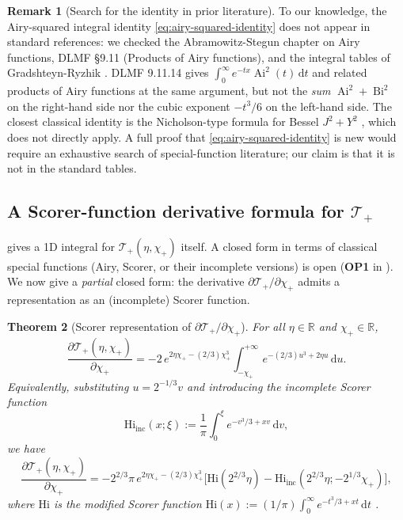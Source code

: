 \documentclass[11pt,a4paper]{article}
\theoremstyle{plain}
\newtheorem{theorem}{Theorem}[section]
\theoremstyle{definition}
\newtheorem{remark}[theorem]{Remark}
\newcommand{\R}{\mathbb{R}}
\renewcommand{\d}{\mathrm{d}}
\newcommand{\Ai}{\operatorname{Ai}}
\newcommand{\Bi}{\operatorname{Bi}}
\begin{document}
\begin{remark}[Search for the identity in prior literature]
To our knowledge, the Airy-squared integral identity \eqref{eq:airy-squared-identity} does not appear in standard references: we checked the Abramowitz-Stegun \cite{AbramowitzStegun} chapter on Airy functions, DLMF \cite{DLMF} \S 9.11 (Products of Airy functions), and the integral tables of Gradshteyn-Ryzhik \cite{GradshteynRyzhik}. DLMF 9.11.14 gives $\int_0^\infty e^{-tx}\Ai^2(t)\,\d t$ and related products of Airy functions at the same argument, but not the \emph{sum} $\Ai^2 + \Bi^2$ on the right-hand side nor the cubic exponent $-t^3/6$ on the left-hand side. The closest classical identity is the Nicholson-type formula for Bessel $J^2 + Y^2$ \cite[\S 10.9.26]{DLMF}, which does not directly apply. A full proof that \eqref{eq:airy-squared-identity} is new would require an exhaustive search of special-function literature; our claim is that it is not in the standard tables.
\end{remark}


\subsection{A Scorer-function derivative formula for $\mathcal T_+$}

 gives a 1D integral for $\mathcal T_+(\eta,\chi_+)$ itself. A closed form in terms of classical special functions (Airy, Scorer, or their incomplete versions) is open (\textbf{OP1} in ). We now give a \emph{partial} closed form: the derivative $\partial\mathcal T_+/\partial\chi_+$ admits a representation as an (incomplete) Scorer function.

\begin{theorem}[Scorer representation of $\partial\mathcal T_+/\partial\chi_+$]\label{thm:scorer-derivative}
For all $\eta \in \R$ and $\chi_+ \in \R$,
\begin{equation}
\frac{\partial\mathcal T_+(\eta,\chi_+)}{\partial\chi_+} = -2\,e^{2\eta\chi_+ - (2/3)\chi_+^3}\int_{-\chi_+}^{+\infty}e^{-(2/3)u^3 + 2\eta u}\,\d u.
\label{eq:scorer-derivative}
\end{equation}
Equivalently, substituting $u = 2^{-1/3}v$ and introducing the \emph{incomplete Scorer function}
$$\mathrm{Hi}_{\mathrm{inc}}(x;\xi) := \frac{1}{\pi}\int_0^{\xi}e^{-v^3/3 + xv}\,\d v,$$
we have
\begin{equation}
\frac{\partial\mathcal T_+(\eta,\chi_+)}{\partial\chi_+} = -2^{2/3}\pi\,e^{2\eta\chi_+ - (2/3)\chi_+^3}\big[\mathrm{Hi}(2^{2/3}\eta) - \mathrm{Hi}_{\mathrm{inc}}(2^{2/3}\eta; -2^{1/3}\chi_+)\big],
\label{eq:scorer-derivative-Hi}
\end{equation}
where $\mathrm{Hi}$ is the modified Scorer function $\mathrm{Hi}(x) := (1/\pi)\int_0^\infty e^{-t^3/3 + xt}\,\d t$ \cite[\S 9.12(ii)]{DLMF}.
\end{theorem}
\end{document}
